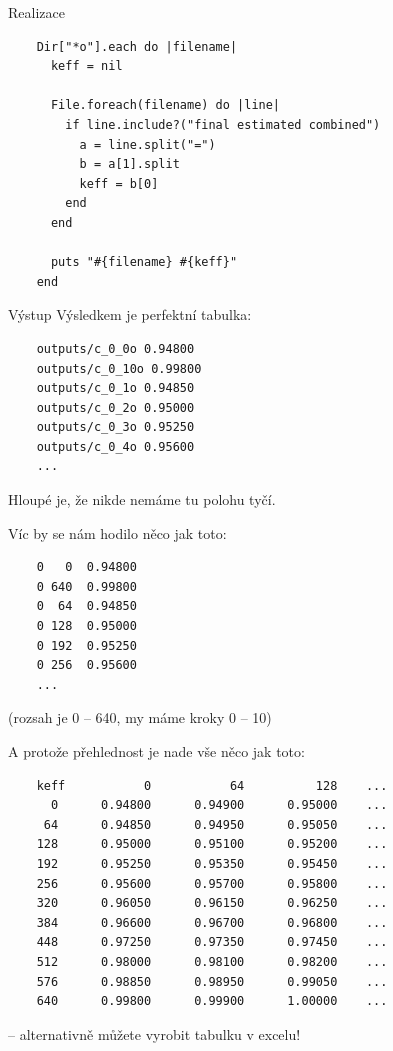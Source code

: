 \documentclass{beamer}
\begin{document}
\begin{frame}[fragile]{Realizace}
  \scriptsize
  \begin{verbatim}
    Dir["*o"].each do |filename|
      keff = nil

      File.foreach(filename) do |line|
        if line.include?("final estimated combined")
          a = line.split("=")
          b = a[1].split
          keff = b[0]
        end
      end

      puts "#{filename} #{keff}"
    end
  \end{verbatim}
\end{frame}

\begin{frame}[fragile]{Výstup}
  Výsledkem je perfektní tabulka:
  {\scriptsize
  \begin{verbatim}
    outputs/c_0_0o 0.94800
    outputs/c_0_10o 0.99800
    outputs/c_0_1o 0.94850
    outputs/c_0_2o 0.95000
    outputs/c_0_3o 0.95250
    outputs/c_0_4o 0.95600
    ...
  \end{verbatim}}
  Hloupé je, že nikde nemáme tu polohu tyčí.
\end{frame}

\begin{frame}[fragile]{Víc by se nám hodilo}
  něco jak toto:
  {\scriptsize
  \begin{verbatim}
    0   0  0.94800
    0 640  0.99800
    0  64  0.94850
    0 128  0.95000
    0 192  0.95250
    0 256  0.95600
    ...
  \end{verbatim}
  }
  (rozsah je 0 -- 640, my máme kroky 0 -- 10)
\end{frame}

\begin{frame}[fragile]{A protože přehlednost je nade vše}
  něco jak toto:
  {\scriptsize
  \begin{verbatim}
    keff           0           64          128    ...
      0      0.94800      0.94900      0.95000    ...
     64      0.94850      0.94950      0.95050    ...
    128      0.95000      0.95100      0.95200    ...
    192      0.95250      0.95350      0.95450    ...
    256      0.95600      0.95700      0.95800    ...
    320      0.96050      0.96150      0.96250    ...
    384      0.96600      0.96700      0.96800    ...
    448      0.97250      0.97350      0.97450    ...
    512      0.98000      0.98100      0.98200    ...
    576      0.98850      0.98950      0.99050    ...
    640      0.99800      0.99900      1.00000    ...
  \end{verbatim}
  }
  -- alternativně můžete vyrobit tabulku v excelu!
\end{frame}
\end{document}
